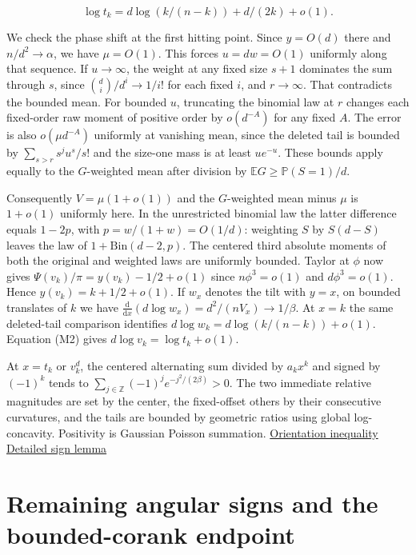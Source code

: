 \begin{equation}
\log t_k=d\log(k/(n-k))+d/(2k)+o(1).
\tag{M2}
\end{equation}

We check the phase shift at the first hitting point. Since $y=O(d)$ there and $n/d^2\to\alpha$, we have $\mu=O(1)$. This forces $u=dw=O(1)$ uniformly along that sequence. If $u\to\infty$, the weight at any fixed size $s+1$ dominates the sum through $s$, since $\binom di/d^i\to1/i!$ for each fixed $i$, and $r\to\infty$. That contradicts the bounded mean. For bounded $u$, truncating the binomial law at $r$ changes each fixed-order raw moment of positive order by $o(d^{-A})$ for any fixed $A$. The error is also $o(\mu d^{-A})$ uniformly at vanishing mean, since the deleted tail is bounded by $\sum_{s>r}s^j u^s/s!$ and the size-one mass is at least $u e^{-u}$. These bounds apply equally to the $G$-weighted mean after division by $\mathbb E G\ge\mathbb P(S=1)/d$.

Consequently $V=\mu(1+o(1))$ and the $G$-weighted mean minus $\mu$ is $1+o(1)$ uniformly here. In the unrestricted binomial law the latter difference equals $1-2p$, with $p=w/(1+w)=O(1/d)$: weighting $S$ by $S(d-S)$ leaves the law of $1+\mathrm{Bin}(d-2,p)$. The centered third absolute moments of both the original and weighted laws are uniformly bounded. Taylor at $\phi$ now gives $\Psi(v_k)/\pi=y(v_k)-1/2+o(1)$ since $n\phi^3=o(1)$ and $d\phi^3=o(1)$. Hence $y(v_k)=k+1/2+o(1)$. If $w_x$ denotes the tilt with $y=x$, on bounded translates of $k$ we have $\frac{\mathrm d}{\mathrm dx}(d\log w_x)=d^2/(n V_x)\to1/\beta$. At $x=k$ the same deleted-tail comparison identifies $d\log w_k=d\log(k/(n-k))+o(1)$. Equation (M2) gives $d\log v_k=\log t_k+o(1)$.

At $x=t_k$ or $v_k^d$, the centered alternating sum divided by $a_k x^k$ and signed by $(-1)^k$ tends to $\sum_{j\in\mathbb Z}(-1)^j e^{-j^2/(2\beta)}>0$. The two immediate relative magnitudes are set by the center, the fixed-offset others by their consecutive curvatures, and the tails are bounded by geometric ratios using global log-concavity. Positivity is Gaussian Poisson summation. \href{https://github.com/ProgramComputer/open-math-research/blob/4fb624ba937a8eecc1361a6066185cd81ab7b172/topics/balanced-arrays/orientation-normalization.md}{Orientation inequality} \enspace \href{https://github.com/ProgramComputer/open-math-research/blob/4fb624ba937a8eecc1361a6066185cd81ab7b172/topics/balanced-arrays/quadratic/proof.md}{Detailed sign lemma}

\section{Remaining angular signs and the bounded-corank endpoint}


